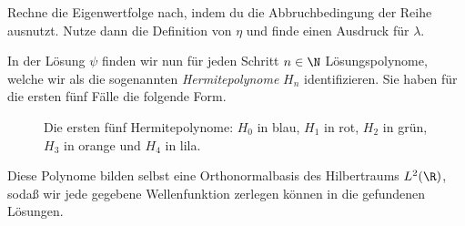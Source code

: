 \documentclass{subfiles}
\begin{document}
    \begin{Aufgabe}
        \nr{} Rechne die Eigenwertfolge nach, indem du die Abbruchbedingung der Reihe ausnutzt. Nutze dann die Definition von $\eta$ und finde einen Ausdruck für $\lambda$. 
    \end{Aufgabe}
    In der Lösung $\psi$ finden wir nun für jeden Schritt $n\in\N$ Lösungspolynome, welche wir als die sogenannten \emph{Hermitepolynome} $H_n$ identifizieren. Sie haben für die ersten fünf Fälle die folgende Form.
    \begin{figure}[H]
        \centering
        \caption{Die ersten fünf Hermitepolynome: $H_0$ in blau, $H_1$ in rot, $H_2$ in grün, $H_3$ in orange und $H_4$ in lila.}
    \end{figure}
    Diese Polynome bilden selbst eine Orthonormalbasis des Hilbertraums $L^2(\R)$, sodaß wir jede gegebene Wellenfunktion zerlegen können in die gefundenen Lösungen.
            
\end{document}
